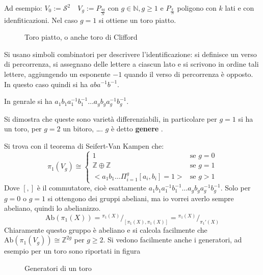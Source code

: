 \documentclass[10pt, twoside=false, x11names]{scrbook}
\newcommand{\Z}{\mathbb{Z}}
\newcommand{\Sph}[1][]{\mathcal{S}^#1}
\newcommand{\Ab}[1]{\mathrm{Ab}( #1 )}
\newcommand*\quot[2]{{^{\textstyle #1}\big/_{\textstyle #2}}}
\begin{document}
Ad esempio:
$ V_0 := \Sph{2} \quad V_g := P_{\frac{4g}{N}} \text{ con } g \in \mathbb{N}, g \geq 1 $ e $ P_{\frac{k}{N}} $ poligono con $ k $ lati e con idenfiticazioni.
Nel caso $ g = 1 $ si ottiene un toro piatto.
\begin{figure}[htbp]
  \centering
  \caption{Toro piatto, o anche toro di Clifford}
  \label{fig:lez3:clifford_torus}
\end{figure}
Si usano simboli combinatori per descrivere l'identificazione: si definisce un verso di percorrenza, si assegnano delle lettere a ciascun
lato e si scrivono in ordine tali lettere, aggiungendo un esponente $ -1 $ quando il verso di percorrenza è opposto. In questo caso quindi
si ha $ aba^{-1}b^{-1} $.

In genrale si ha $ a_1 b_1 a_1^{-1} b_1^{-1} \dots a_g b_g a_g^{-1} b_g^{-1} $.

Si dimostra che queste sono varietà differenziabili, in particolare per $ g = 1 $ si ha un toro, per $ g = 2 $ un bitoro, \dots. $ g $ è
detto \textbf{genere} .

Si trova con il teorema di Seifert-Van Kampen che:
\[
  \pi_1(V_g) \cong
  \begin{cases}
    1 & \text{se } g = 0 \\
    \Z \oplus \Z & \text{se } g = 1 \\
    < a_1 b_1 \dots \Pi_{i=1}^g [a_i,b_i] = 1 > & \text{se } g > 1
  \end{cases}
\]
Dove $ [,] $ è il commutatore, cioè esattamente $ a_1 b_1 a_1^{-1} b_1^{-1} \dots a_g b_g a_g^{-1} b_g^{-1} $.
Solo per $ g = 0 $ o $ g = 1 $ si ottengono dei gruppi abeliani, ma io vorrei averlo sempre abeliano, quindi lo abelianizzo.
\[
  \Ab{\pi_1(X)} = \quot{\pi_1(X)}{[\pi_1(X), \pi_1(X)]} = \quot{\pi_1(X)}{\pi_1'(X)}
\]
Chiaramente questo gruppo è abeliano e si calcola facilmente che $ \Ab{\pi_1(V_g)} \cong \Z^{2g} $ per $ g \geq 2 $.
Si vedono facilmente anche i generatori, ad esempio per un toro sono riportati in figura

\begin{figure}[htbp]
  \centering
  
  \caption{Generatori di un toro}
  \label{fig:lez3:torus_generators}
\end{figure}
\end{document}
